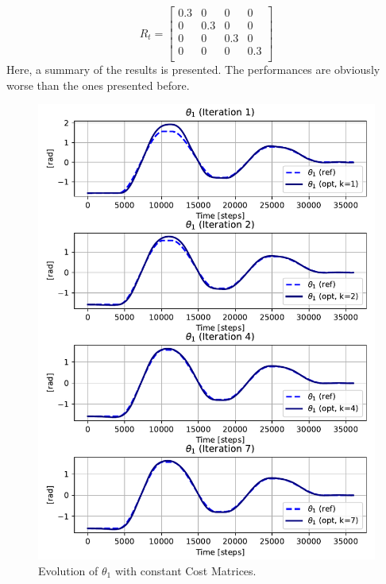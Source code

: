 \begin{equation}
R_t = 
\begin{bmatrix}
    0.3 & 0 & 0 & 0\\
    0 & 0.3 & 0 & 0\\
    0 & 0 & 0.3 & 0\\
    0 & 0 & 0 & 0.3\\
\end{bmatrix}
\label{eq:ConstantR}
\end{equation}
\newline
Here, a summary of the results is presented.\newline
The performances are obviously worse than the ones presented before.

\begin{figure}[htb]
    \centering
    \includegraphics[width=1\linewidth]{img/2-task2/t1_const.pdf}
    \caption{Evolution of $\theta_1$ with constant Cost Matrices.}
    \label{fig:th1const_}
\end{figure}

